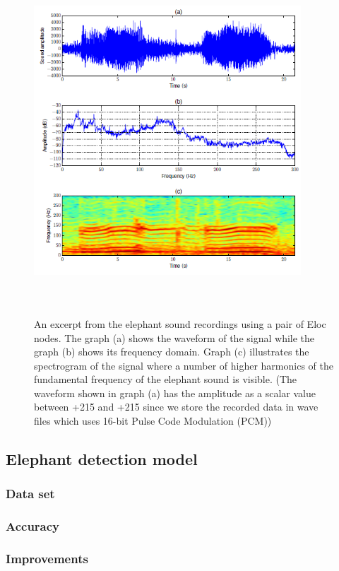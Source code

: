 \documentclass[12pt]{article}
\numberwithin{figure}{section}
\numberwithin{table}{section}
\begin{document}
\begin{figure}[H]
\centering
\includegraphics[width=10cm,height=13cm,keepaspectratio]{wild_recordings.png}
\caption{An excerpt from the elephant sound recordings using
a pair of Eloc nodes. The graph (a) shows the waveform
of the signal while the graph (b) shows its frequency domain.
Graph (c) illustrates the spectrogram of the signal where a
number of higher harmonics of the fundamental frequency of
the elephant sound is visible. (The waveform shown in graph
(a) has the amplitude as a scalar value between +215 and
+215 since we store the recorded data in wave files which
uses 16-bit Pulse Code Modulation (PCM))}
\label{d:p7}
\end{figure}

\subsection{Elephant detection model}
\subsubsection{Data set}
\subsubsection{Accuracy}
\subsubsection{Improvements}
\end{document}
